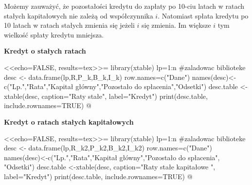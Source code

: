 \documentclass{article}
\begin{document}
\begin{center}
Możemy zauważyć, że pozostałości kredytu do zapłaty po 10-ciu latach w ratach stałych kapitałowych nie zależą od współczynnika $i$. Natomiast spłata kredytu po 10 latach w ratach stałych zmienia się jeżeli $i$ się zmienia. Im większe $i$ tym wielkość spłaty kredytu mniejsza.


\end{center}
\newpage
\bigskip

\bigskip


\noindent{\large\textbf{}}

\bigskip


\noindent{\large\textbf{}}

\centerline{\large{\textbf{Kredyt o stałych ratach}}}
<<echo=FALSE, results=tex>>=
library(xtable) 
lp=1:n #zaladowac biblioteke
desc <- data.frame(lp,R,P_k,B_k,I_k)
                                   row.names=c("Dane")
names(desc)<-c("Lp.","Rata","Kapitał główny","Pozostało do spłacenia","Odsetki")
desc.table <-xtable(desc, caption="Raty stałe",
                                  label="Kredyt")
print(desc.table, include.rownames=TRUE)
@

\newpage
\bigskip

\bigskip


\noindent{\large\textbf{}}

\bigskip


\noindent{\large\textbf{}}

\centerline{\large{\textbf{Kredyt o ratach stałych kapitałowych}}}
<<echo=FALSE, results=tex>>=
library(xtable) 
lp=1:n #zaladowac biblioteke
desc <- data.frame(lp,R_k2,P_k2,B_k2,I_k2)
                                   row.names=c("Dane")
names(desc)<-c("Lp.","Rata","Kapitał główny","Pozostało do spłacenia", "Odsetki")
desc.table <-xtable(desc, caption="Raty stałe kapitałowe ",
                                  label="Kredyt")
print(desc.table, include.rownames=TRUE)
@
                                                
\end{document}
